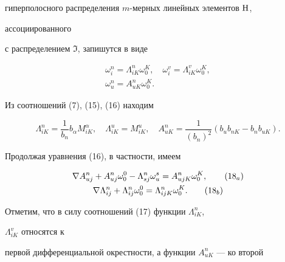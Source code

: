 гиперполосного распределения $m$-мерных линейных элементов $\mathrm H$, 


ассоциированного 


с распределением $\Im$, запишутся в виде 


\begin{equation} 


\begin{array}{c} 


\omega^n_i=\Lambda^n_{iK}\omega^K_0,\quad 


\omega^v_i=\Lambda^v_{iK}\omega^K_0,\\[2mm] 


\omega^n_u=A^n_{uK}\omega^K_0. 


\end{array} 


\end{equation} 


Из соотношений (7), (15), (16) находим 


\begin{equation} 


\Lambda^n_{iK}=\frac{1}{b_n}b_\alpha M^\alpha_{iK},\quad 


\Lambda^u_{iK}=M^u_{iK},\quad A^n_{uK}=\frac{1}{(b_n)^2} 


(b_u b_{nK}-b_n b_{uK}). 


\end{equation} 


Продолжая уравнения (16), в частности, имеем 


\begin{gather} 


\nabla A^n_{uj}+A^n_{uj}\omega^0_0-\Lambda^n_{sj} 


\omega^s_u=A^n_{ujK}\omega^K_0, \tag{18${}_a$} \\ 


\nabla\Lambda^n_{ij}+\Lambda^n_{ij}\omega^0_0= 


\Lambda^n_{ijK}\omega^K_0. \tag{18${}_b$} 


\end{gather} 


\addtocounter{equation}{1}


 


Отметим, что в силу соотношений (17) функции $\Lambda^n_{iK}$, 


$\Lambda^v_{iK}$ относятся к 


первой дифференциальной окрестности, а функции $A^n_{uK}$ --- ко второй 


